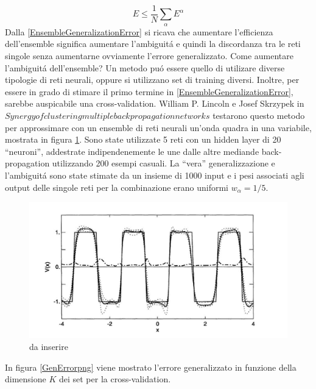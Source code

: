 \documentclass[a4paper,10pt]{article}
\begin{document}
  \begin{equation}
   E \le \frac{1}{N} \sum_{\alpha} E^{\alpha}
  \end{equation}
  Dalla \ref{EnsembleGeneralizationError} si ricava che aumentare l'efficienza dell'ensemble significa aumentare l'ambiguit\'a e quindi la discordanza tra le reti singole senza aumentarne ovviamente l'errore generalizzato. Come aumentare l'ambiguit\'a dell'ensemble? Un metodo pu\'o essere quello di utilizare diverse tipologie di reti neurali, oppure si utilizzano set di training diversi. Inoltre, per essere in grado di stimare il primo termine in \ref{EnsembleGeneralizationError}, sarebbe auspicabile una cross-validation. William P. Lincoln e Josef Skrzypek in $Synergy of clustering multiple back propagation networks$ testarono questo metodo per approssimare con un ensemble di reti neurali un'onda quadra in una variabile, mostrata in figura \ref{SqWavepng}. Sono state utilizzate 5 reti con un hidden layer di 20 ``neuroni'', addestrate indipendenemente le une dalle altre mediande back-propagation utilizzando 200 esempi casuali. La ``vera'' generalizzazione e l'ambiguit\'a sono state stimate da un insieme di 1000 input e i pesi associati agli output delle singole reti per la combinazione erano uniformi $w_{\alpha} = 1/5$.
  \begin{figure}[h!]
   \centering
   \includegraphics[scale=0.4]{SqWave.png}
   \caption{da inserire}
   \label{SqWavepng}
  \end{figure}
  In figura \ref{GenErrorpng} viene mostrato l'errore generalizzato in funzione della dimensione $K$ dei set per la cross-validation.
\end{document}

